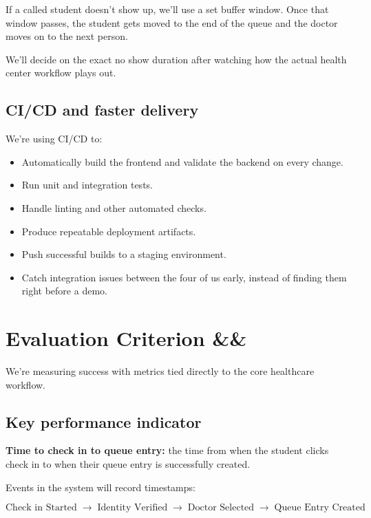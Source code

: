 \documentclass[11pt,a4paper]{article}
\newcommand{\BvrHint}[1]{%
  \ifx&#1&%
  \else
    {\normalfont\normalsize\itshape\hfill #1}%
  \fi}
\begin{document}
If a called student doesn't show up, we'll use a set buffer window. Once that window passes, the student gets moved to the end of the queue and the doctor moves on to the next person.

We'll decide on the exact no show duration after watching how the actual health center workflow plays out.

\subsection{CI/CD and faster delivery}

We're using CI/CD to:

\begin{itemize}
    \item Automatically build the frontend and validate the backend on every change.
    \item Run unit and integration tests.
    \item Handle linting and other automated checks.
    \item Produce repeatable deployment artifacts.
    \item Push successful builds to a staging environment.
    \item Catch integration issues between the four of us early, instead of finding them right before a demo.
\end{itemize}


\section{Evaluation Criterion \BvrHint{}}

We're measuring success with metrics tied directly to the core healthcare workflow.

\subsection{Key performance indicator}

\textbf{Time to check in to queue entry:} the time from when the student clicks check in to when their queue entry is successfully created.

Events in the system will record timestamps:

\[
\text{Check in Started}
\;\rightarrow\;
\text{Identity Verified}
\;\rightarrow\;
\text{Doctor Selected}
\;\rightarrow\;
\text{Queue Entry Created}
\]
\end{document}

